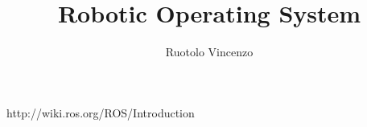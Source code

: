\documentclass{ol-softwaremanual}
\title{Robotic Operating System}
\author{Ruotolo Vincenzo}
\begin{document}
    \maketitle
    
    \tableofcontents
    \listoflistings
    \newpage
    
    
    
    \newpage
    
    
    
    \newpage
    
    
    
    \newpage

    
    \begin{thebibliography}{9}
    
            http://wiki.ros.org/ROS/Introduction
        
        
    \end{thebibliography}
\end{document}

